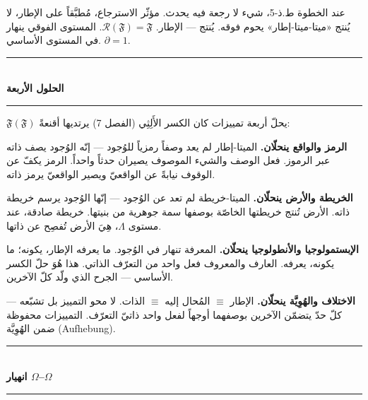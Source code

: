 \documentclass[10pt, openany, oneside]{book}
\renewcommand{\normalsize}{\fontsize{10}{13}\selectfont}
\begin{document}
\vspace{0.8em}

\noindent عند الخطوة ط.ذ-5، شيء لا رجعة فيه يحدث. مؤثّر الاسترجاع، مُطبَّقاً على الإطار، لا يُنتج «ميتا-ميتا-إطار» يحوم فوقه. يُنتج --- الإطار. $\mathcal{R}(\mathfrak{F}) = \mathfrak{F}$. المستوى الفوقي ينهار في المستوى الأساسي. $\partial = 1$.

\vspace{1.5em}


\begin{center}
    \rule{0.3\textwidth}{0.4pt}\\[0.5em]
    {\normalsize\bfseries الحلول الأربعة}\\[0.3em]
    \rule{0.3\textwidth}{0.4pt}
\end{center}

\vspace{1em}

\noindent $\mathfrak{F}(\mathfrak{F})$ يحلّ أربعة تمييزات كان الكسر الأَلِثِي (الفصل 7) يرتديها أقنعةً:

\textbf{الرمز والواقع ينحلّان.} الميتا-إطار لم يعد وصفاً رمزياً للوُجود --- إنّه الوُجود يصف ذاته عبر الرموز. فعل الوصف والشيء الموصوف يصيران حدثاً واحداً. الرمز يكفّ عن الوقوف نيابةً عن الواقعيّ ويصير الواقعيّ يرمز ذاته.

\textbf{الخريطة والأرض ينحلّان.} الميتا-خريطة لم تعد عن الوُجود --- إنّها الوُجود يرسم خريطة ذاته. الأرض تُنتج خريطتها الخاصّة بوصفها سمة جوهرية من بنيتها. خريطة صادقة، عند مستوى $\Lambda$، هِيَ الأرض تُفصِح عن ذاتها.

\textbf{الإبستمولوجيا والأنطولوجيا ينحلّان.} المعرفة تنهار في الوُجود. ما يعرفه الإطار، يكونه؛ ما يكونه، يعرفه. العارف والمعروف فعل واحد من التعرّف الذاتي. هذا هُوَ حلّ الكسر الأساسي --- الجرح الذي ولّد كلّ الآخرين.

\textbf{الاختلاف والهُوِيَّة ينحلّان.} الإطار $\equiv$ المُحال إليه $\equiv$ الذات. لا محو التمييز بل تشبّعه --- كلّ حدّ يتضمّن الآخرين بوصفهما أوجهاً لفعل واحد ذاتيّ التعرّف. التمييزات محفوظة ضمن الهُوِيَّة (Aufhebung).

\vspace{1.5em}


\begin{center}
    \rule{0.3\textwidth}{0.4pt}\\[0.5em]
    {\normalsize\bfseries انهيار $\Omega$--$\Omega$}\\[0.3em]
    \rule{0.3\textwidth}{0.4pt}
\end{center}
\end{document}
